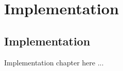 \chapter{Implementation} \label{chap:Implementation}

\section{Implementation}

Implementation chapter here ...


